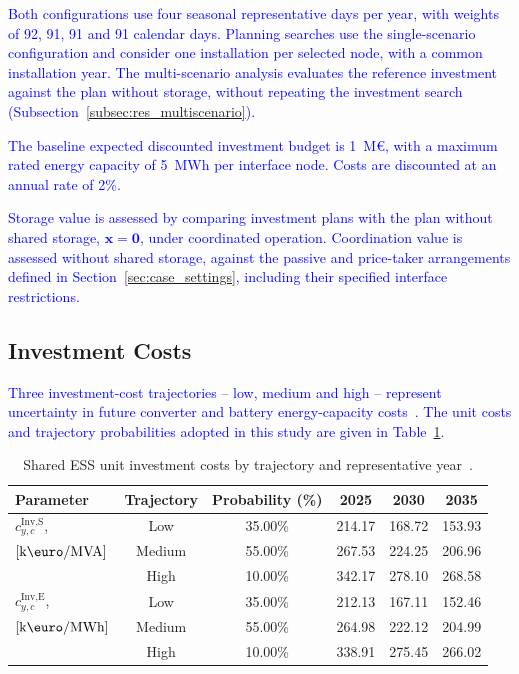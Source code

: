 \documentclass[preprint,12pt]{elsarticle}
\begin{document}
\textcolor{blue}{
    Both configurations use four seasonal representative days per year, with weights of 92, 91, 91 and 91 calendar days.
    Planning searches use the single-scenario configuration and consider one installation per selected node, with a common installation year. The multi-scenario analysis evaluates the reference investment against the plan without storage, without repeating the investment search (Subsection~\ref{subsec:res_multiscenario}).
}

\textcolor{blue}{
    The baseline expected discounted investment budget is 1~M\euro{}, with a maximum rated energy capacity of 5~MWh per interface node. Costs are discounted at an annual rate of 2\%.
}

\textcolor{blue}{
    Storage value is assessed by comparing investment plans with the plan without shared storage, $\boldsymbol{x}=\boldsymbol{0}$, under coordinated operation.
    Coordination value is assessed without shared storage, against the passive and price-taker arrangements defined in Section~\ref{sec:case_settings}, including their specified interface restrictions.
}

\subsection{Investment Costs}
\label{subsec:case_investment_costs}

\textcolor{blue}{
    Three investment-cost trajectories -- low, medium and high -- represent uncertainty in future converter and battery energy-capacity costs~\cite{nrel_ess_costs,iea_ess_2024}. The unit costs and trajectory probabilities adopted in this study are given in Table~\ref{tab:investment_cost}.
}

\begin{table}[htbp!]
    \centering    
    \caption{Shared ESS unit investment costs by trajectory and representative year~\cite{nrel_ess_costs}.}
    \begin{tabular}{lcc ccc}
        \toprule
        Parameter & Trajectory & Probability (\%) & 2025 & 2030 & 2035 \\
        \midrule
        $c^\text{Inv,S}_{y,c}$,             & Low       & 35.00\% & 214.17 & 168.72 & 153.93\\
        $\left[\text{k\euro/MVA}\right]$    & Medium    & 55.00\% & 267.53 & 224.25 & 206.96\\
        ~                                   & High      & 10.00\% & 342.17 & 278.10 & 268.58\\
        \midrule
        $c^\text{Inv,E}_{y,c}$,             & Low       & 35.00\% & 212.13 & 167.11 & 152.46\\
        $\left[\text{k\euro/MWh}\right]$    & Medium    & 55.00\% & 264.98 & 222.12 & 204.99\\
        ~                                   & High      & 10.00\% & 338.91 & 275.45 & 266.02\\
        \bottomrule
    \end{tabular}
    \label{tab:investment_cost}
\end{table}
\end{document}
